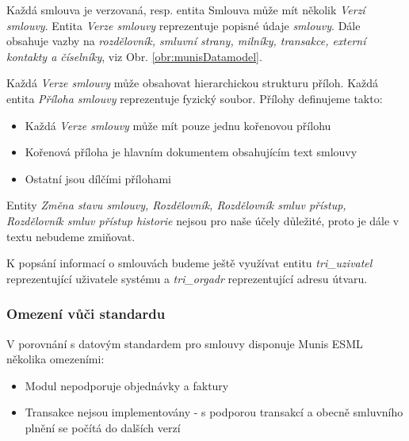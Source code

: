 Každá smlouva je verzovaná, resp. entita Smlouva může mít několik \textit{Verzí smlouvy}. Entita \textit{Verze smlouvy} reprezentuje popisné údaje \textit{smlouvy}. Dále obsahuje vazby na \textit{rozdělovník, smluvní strany, milníky, transakce, externí kontakty a číselníky}, viz Obr. \ref{obr:munisDatamodel}.

Každá \textit{Verze smlouvy} může obsahovat hierarchickou strukturu příloh. Každá entita \textit{Příloha smlouvy} reprezentuje fyzický soubor. Přílohy definujeme takto:

\begin{itemize}
\item Každá \textit{Verze smlouvy} může mít pouze jednu kořenovou přílohu
\item Kořenová příloha je hlavním dokumentem obsahujícím text smlouvy
\item Ostatní jsou dílčími přílohami
\end{itemize}

Entity \textit{Změna stavu smlouvy, Rozdělovník, Rozdělovník smluv přístup, Rozdělovník smluv přístup historie} nejsou pro naše účely důležité, proto je dále v textu nebudeme zmiňovat.

K popsání informací o smlouvách budeme ještě využívat entitu \textit{tri\_uzivatel} reprezentující uživatele systému a \textit{tri\_orgadr} reprezentující adresu útvaru. 

\subsubsection{Omezení vůči standardu}

V porovnání s datovým standardem pro smlouvy disponuje Munis ESML několika omezeními:

\begin{itemize}
\item Modul nepodporuje objednávky a faktury
\item Transakce nejsou implementovány - s podporou transakcí a obecně smluvního plnění se počítá do dalších verzí 
\end{itemize}

